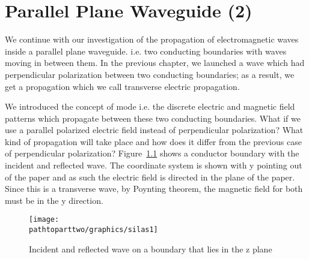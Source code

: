 \chapter{Parallel Plane Waveguide (2)}\label{lec:lec36}
We continue with our investigation of the propagation of electromagnetic waves inside a parallel plane waveguide. i.e. two conducting boundaries with waves moving in between them. In the previous chapter, we launched a wave which had perpendicular polarization between two conducting boundaries; as a result, we get a propagation which we call transverse electric propagation.

We introduced the concept of mode i.e. the discrete electric and magnetic field patterns which propagate between these two conducting boundaries. What if we use a parallel polarized electric field instead of perpendicular polarization? What kind of propagation will take place and how does it differ from the previous case of perpendicular polarization? Figure~\ref{fig:silas1} shows a conductor boundary with the incident and reflected wave. The coordinate system is shown with y pointing out of the paper and as such the electric field is directed in the plane of the paper. Since this is a transverse wave, by Poynting theorem, the magnetic field for both must be in the y direction.
\begin{figure}[h]
\centering
\texttt{[image: \\pathtoparttwo/graphics/silas1]}
\caption{Incident and reflected wave on a boundary that lies in the z plane}
\label{fig:silas1}
\end{figure}

